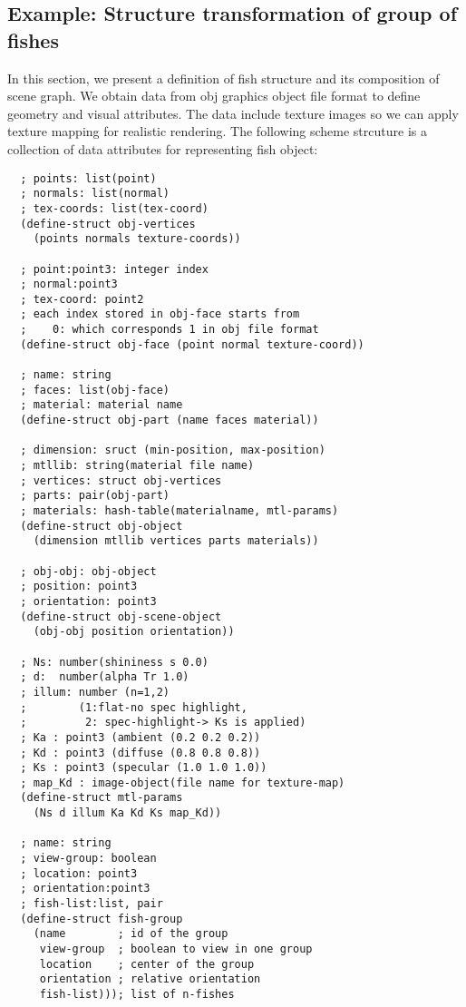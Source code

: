 \documentclass[preprint,nocopyrightspace]{sigplanconf}
\begin{document}
\subsection{Example: Structure transformation of group of fishes}
In this section, we present a definition of fish structure and its composition of scene graph. We obtain data from obj graphics object file format to define geometry and visual attributes. The data include texture images so we can apply texture mapping for realistic rendering. The following scheme strcuture is a collection of data attributes for representing fish object:
{\small
\begin{verbatim}
  ; points: list(point)
  ; normals: list(normal)
  ; tex-coords: list(tex-coord)
  (define-struct obj-vertices 
    (points normals texture-coords))

  ; point:point3: integer index
  ; normal:point3
  ; tex-coord: point2
  ; each index stored in obj-face starts from 
  ;    0: which corresponds 1 in obj file format
  (define-struct obj-face (point normal texture-coord))

  ; name: string
  ; faces: list(obj-face)
  ; material: material name
  (define-struct obj-part (name faces material))

  ; dimension: sruct (min-position, max-position)
  ; mtllib: string(material file name)
  ; vertices: struct obj-vertices
  ; parts: pair(obj-part)
  ; materials: hash-table(materialname, mtl-params)
  (define-struct obj-object 
    (dimension mtllib vertices parts materials))

  ; obj-obj: obj-object
  ; position: point3
  ; orientation: point3
  (define-struct obj-scene-object 
    (obj-obj position orientation))

  ; Ns: number(shininess s 0.0)
  ; d:  number(alpha Tr 1.0)
  ; illum: number (n=1,2) 
  ;        (1:flat-no spec highlight,
  ;         2: spec-highlight-> Ks is applied)
  ; Ka : point3 (ambient (0.2 0.2 0.2))
  ; Kd : point3 (diffuse (0.8 0.8 0.8))
  ; Ks : point3 (specular (1.0 1.0 1.0))
  ; map_Kd : image-object(file name for texture-map)
  (define-struct mtl-params 
    (Ns d illum Ka Kd Ks map_Kd))

  ; name: string
  ; view-group: boolean
  ; location: point3
  ; orientation:point3
  ; fish-list:list, pair
  (define-struct fish-group 
    (name        ; id of the group
     view-group  ; boolean to view in one group
     location    ; center of the group
     orientation ; relative orientation
     fish-list))); list of n-fishes
\end{verbatim}
}
\end{document}
